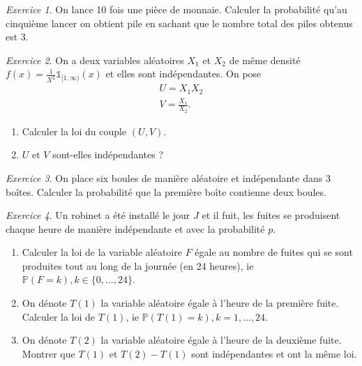 \documentclass[french]{book}
\theoremstyle{definition}
\theoremstyle{remark}
\newtheorem{exo}{Exercice}
\begin{document}
\begin{exo}
  On lance 10 fois une pièce de monnaie. Calculer la probabilité qu'au cinquième lancer on obtient pile en sachant que le nombre total des piles obtenus est 3.
\end{exo}

\begin{exo}
  On a deux variables aléatoires \(X_1\) et \(X_2\) de même densité \(f(x) = \frac{1}{X ^2} \mathds{1}_{[1, \infty)}(x)\) et elles sont indépendantes. On pose
  \begin{gather*}
    U = X_1 X_2 \\
    V = \frac{X_1}{X_2}.
  \end{gather*}

  \begin{enumerate}
    \item Calculer la loi du couple \((U,V)\).
    \item \(U \text{ et } V \) sont-elles indépendantes ?
  \end{enumerate}
\end{exo}

\begin{exo}
  On place six boules de manière aléatoire et indépendante dans 3 boîtes. Calculer la probabilité que la première boîte contienne deux boules.
\end{exo}

\begin{exo}
  Un robinet a été installé le jour \(J\) et il fuit, les fuites se produisent chaque heure de manière indépendante et avec la probabilité \(p\).

  \begin{enumerate}
    \item Calculer la loi de la variable aléatoire \(F\) égale au nombre de fuites qui se sont produites tout au long de la journée (en 24 heures), ie \(\mathbb{P}(F=k), k \in \{ 0, \dots, 24 \}\).
    \item On dénote \(T(1)\) la variable aléatoire égale à l'heure de la première fuite. Calculer la loi de \(T(1)\), ie \(\mathbb{P}(T(1) = k), k=1, \dots, 24\).
    \item On dénote \(T(2)\) la variable aléatoire égale à l'heure de la deuxième fuite. Montrer que \(T(1)\) et \(T(2)-T(1)\) sont indépendantes et ont la même loi.
  \end{enumerate}
\end{exo}
\end{document}
